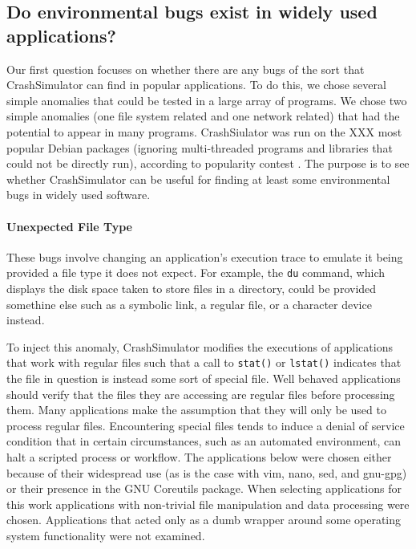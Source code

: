 \subsection{Do environmental bugs  exist in widely used applications?}

Our first question focuses on whether there are any bugs of the sort that
CrashSimulator can find in popular applications.  To do this, we 
chose several simple anomalies that could be tested in a large
array of programs.  We chose two simple anomalies (one file system
related and one network related) that had the potential to appear in
many programs.  CrashSiulator was run on the XXX most popular Debian
packages (ignoring multi-threaded programs and libraries that could not be 
directly run), according to popularity contest .
The purpose is to see whether CrashSimulator can be useful
for finding at least some environmental bugs in widely used software.


\paragraph{Unexpected File Type}
These bugs involve changing an application's execution trace to emulate it 
being provided a file type it does not expect.  For example, the {\tt du} 
command, which displays the disk space taken to store files in a directory, 
could be provided somethine else such as a symbolic link, a regular file, or 
a character device instead.

To inject this anomaly, CrashSimulator
modifies the executions of applications that work with regular files such that a call to
{\tt stat()} or {\tt lstat()} indicates that the file in question is instead some sort of special file.  Well
behaved applications should verify that the files they are accessing are regular files before processing them.
Many applications make the assumption that they will only be used to process regular files.  Encountering
special files tends to induce a denial of service condition that in certain circumstances, such as an automated
environment, can halt a scripted process or workflow.  The applications below were chosen either because of
their widespread use (as is the case with vim, nano, sed, and gnu-gpg) or their presence in the GNU Coreutils
package.  When selecting applications for this work applications with non-trivial file manipulation and data
processing were chosen.  Applications that acted only as a dumb wrapper around 
some operating system functionality were not examined.  


